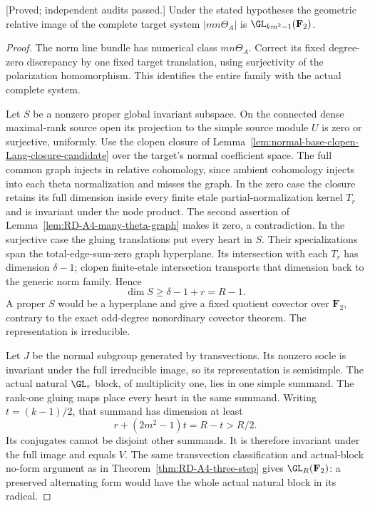 \begin{theorem}
\label{thm:good-theta-odd-norm-step-candidate}
\textup{[Proved; independent audits passed.]}
Under the stated hypotheses the geometric relative image of the
complete target system $|mn\Theta_A|$ is
$\GL_{km^2-1}(\mathbf F_2)$.
\end{theorem}
\begin{proof}
The norm line bundle has numerical class $mn\Theta_A$.
Correct its fixed degree-zero discrepancy by one fixed target
translation, using surjectivity of the polarization homomorphism.
This identifies the entire family with the actual complete system.

Let $S$ be a nonzero proper global invariant subspace. On the
connected dense maximal-rank source open its projection to the
simple source module $U$ is zero or surjective, uniformly.
Use the clopen closure of
Lemma~\ref{lem:normal-base-clopen-Lang-closure-candidate} over the
target's normal coefficient space. The full common graph injects
in relative cohomology, since ambient cohomology injects into each
theta normalization and misses the graph.
In the zero case the closure retains its full dimension inside
every finite etale partial-normalization kernel $T_r$ and is
invariant under the node product. The second assertion of
Lemma~\ref{lem:RD-A4-many-theta-graph} makes it zero, a contradiction.
In the surjective case the gluing translations put every heart
in $S$. Their specializations span the total-edge-sum-zero graph
hyperplane. Its intersection with each $T_r$ has dimension
$\delta-1$; clopen finite-etale intersection transports that
dimension back to the generic norm family. Hence
\[
                    \dim S\ge\delta-1+r=R-1.
\]
A proper $S$ would be a hyperplane and give a fixed quotient
covector over $\mathbf F_2$, contrary to the exact odd-degree
nonordinary covector theorem. The representation is irreducible.

Let $J$ be the normal subgroup generated by transvections.
Its nonzero socle is invariant under the full irreducible image,
so its representation is semisimple. The actual natural
$\GL_r$ block, of multiplicity one, lies in one simple summand.
The rank-one gluing maps place every heart in the same summand.
Writing $t=(k-1)/2$, that summand has dimension at least
\[
                r+(2m^2-1)t=R-t>R/2.
\]
Its conjugates cannot be disjoint other summands. It is therefore
invariant under the full image and equals $V$.
The same transvection classification and actual-block no-form
argument as in Theorem~\ref{thm:RD-A4-three-step} gives
$\GL_R(\mathbf F_2)$: a preserved alternating form would have
the whole actual natural block in its radical.
\end{proof}

